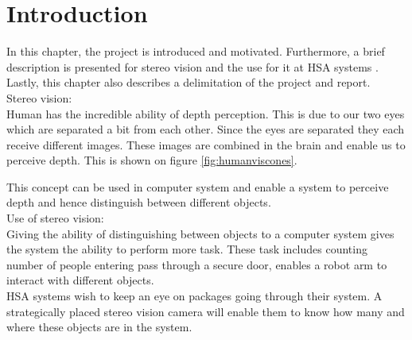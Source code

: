\chapter{Introduction}\label{ch:introduction}
In this chapter, the project is introduced and motivated. Furthermore, a brief description is presented for stereo vision and the use for it at HSA systems . Lastly, this chapter also describes a delimitation of the project and report.\\

Stereo vision:\\
Human has the incredible ability of depth perception. This is due to our two eyes which are separated a bit from each other. Since the eyes are separated they each receive different images. These images are combined in the brain and enable us to perceive depth. This is shown on figure \ref{fig:humanviscones}. 


This concept can be used in computer system and enable a system to perceive depth and hence distinguish between different objects.\\

Use of stereo vision:\\
Giving the ability of distinguishing between objects to a computer system gives the system the ability to perform more task. These task includes counting number of people entering pass through a secure door, enables a robot arm to interact with different objects.\\

HSA systems wish to keep an eye on packages going through their system. A strategically placed stereo vision camera will enable them to know how many and where these objects are in the system. 

%
%
%

